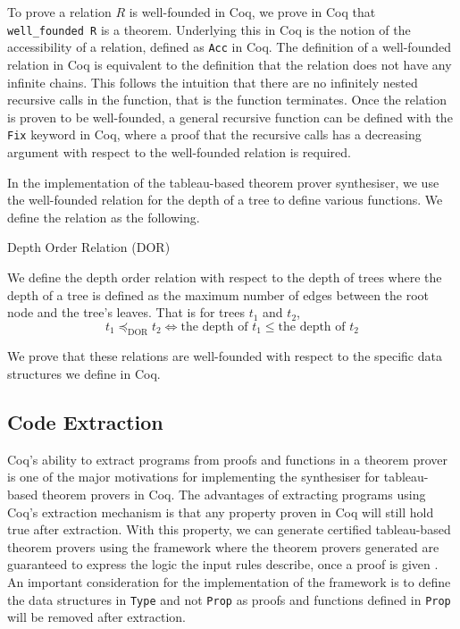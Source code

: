 \documentclass{llncs}
\begin{document}
To prove a relation $R$ is well-founded in Coq, we prove in Coq that
\\\verb+well_founded R+ is a theorem. Underlying this in Coq is the notion of
the accessibility of a relation, defined as \verb+Acc+ in Coq.  The definition
of a well-founded relation in Coq is equivalent to the definition that the
relation does not have any infinite chains. This follows the intuition that
there are no infinitely nested recursive calls in the function, that is the
function terminates. Once the relation is proven to be well-founded, a general
recursive function can be defined with the \verb+Fix+ keyword in Coq, where a
proof that the recursive calls has a decreasing argument with respect to the
well-founded relation is required.

In the implementation of the tableau-based theorem prover synthesiser, we use
the well-founded relation for the depth of a tree to define various functions.
We define the relation as the following.
%
\begin{definition}{Depth Order Relation (DOR)}

We define the depth order relation with respect to the depth of trees where the
depth of a tree is defined as the maximum number of edges between the root node
and the tree's leaves.
That is for trees $t_1$ and $t_2$,
%
\begin{equation}
t_1 \preceq_{\textrm{DOR}} t_2 \iff \textrm{the
depth of } t_1 \leq \textrm{the depth of } t_2
\label{depthOrder}
\end{equation}
\end{definition}
%
We prove that these relations are well-founded with respect to the specific
data structures we define in Coq.
%
\subsection{Code Extraction}
%
Coq's ability to extract programs from proofs and functions in a theorem prover
is one of the major motivations for implementing the synthesiser for
tableau-based theorem provers in Coq. The advantages of extracting programs
using Coq's extraction mechanism is that any property proven in Coq will still
hold true after extraction. With this property, we can generate certified
tableau-based theorem provers using the framework where the theorem provers
generated are guaranteed to express the logic the input rules describe, once
a proof is given \cite{letouzey2008extraction}. An important consideration for
the implementation of the framework is to define the data structures in
\verb+Type+ and not \verb+Prop+ as proofs and functions defined in \verb+Prop+
will be removed after extraction.
%
\end{document}
